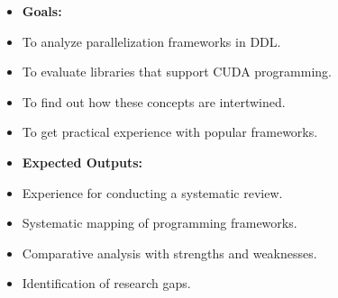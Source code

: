 \begin{itemize}
	\item \textbf{Goals:}
	\item To analyze parallelization frameworks in DDL.
	\item To evaluate libraries that support CUDA programming.
	\item To find out how these concepts are intertwined.
	\item To get practical experience with popular frameworks. \\
	\item \textbf{Expected Outputs:}
	\item Experience for conducting a systematic review.
	\item Systematic mapping of programming frameworks.
	\item Comparative analysis with strengths and weaknesses.
	\item Identification of research gaps. \\
\end{itemize}


